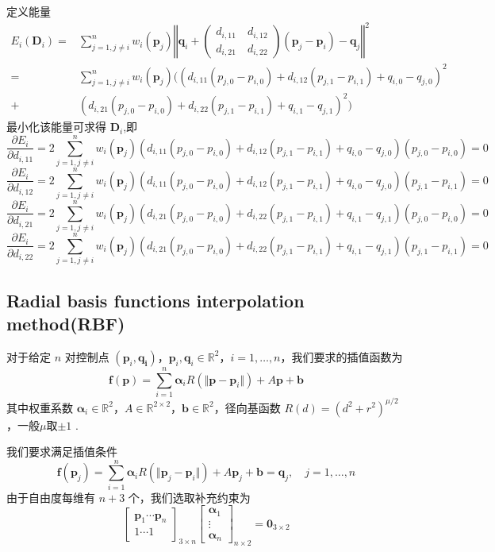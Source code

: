 \documentclass{article}
\begin{document}
	定义能量
	\begin{equation}
		\begin{aligned}
			E_i(\mathbf{D}_i)
			=&\sum_{j=1,j\neq i}^n w_{i}(\mathbf{p}_j)\left\Vert 
				\mathbf{q} _ i+\left(
				\begin{array}{c}d _ {i,11} \quad d _ 
					{i,12}\\ d _ {i,21} \quad d _ 
					{i,22}
				\end{array}
			\right)(\mathbf{p} _ 
				j-\mathbf{p} _ i)-\mathbf{q} _ j
			\right\Vert^2\\
			=&\sum _ {j=1,j\neq 
				i}^n w_{i}(\mathbf{p}_j)((d _ {i,11}(p _ {j,0}-p _ {i,0})+d _ 
				{i,12}(p _ {j,1}-p _ {i,1})+q _ {i,0}-q _ {j,0})^2\\
				+&(d _ {i,21}(p _ {j,0}-p _ {i,0})+d _ {i,22}(p _ {j,1}-p _ 
				{i,1})+q _ {i,1}-q _ {j,1})^2)
		\end{aligned}
	\end{equation}
	最小化该能量可求得 $\mathbf{D}_i$,即
	$$
	\frac{\partial E_i}{\partial d_{i,11}}
	=2\sum_{j=1,j\neq i}^n w_{i}(\mathbf{p}_j)
	(d_{i,11}(p_{j,0}-p_{i,0})+d_{i,12}(p_{j,1}-p_{i,1})+q_{i,0}-q_{j,0})
	(p_{j,0}-p_{i,0})=0
	$$
	$$
	\frac{\partial E_i}{\partial d_{i,12}}
	=2\sum_{j=1,j\neq i}^n w_{i}(\mathbf{p}_j)
	(d_{i,11}(p_{j,0}-p_{i,0})+d_{i,12}(p_{j,1}-p_{i,1})+q_{i,0}-q_{j,0})
	(p_{j,1}-p_{i,1})=0
	$$
	$$
	\frac{\partial E_i}{\partial d_{i,21}}
	=2\sum_{j=1,j\neq i}^n w_{i}(\mathbf{p}_j)
	(d_{i,21}(p_{j,0}-p_{i,0})+d_{i,22}(p_{j,1}-p_{i,1})+q_{i,1}-q_{j,1})
	(p_{j,0}-p_{i,0})=0
	$$
	$$
	\frac{\partial E_i}{\partial d_{i,22}}
	=2\sum_{j=1,j\neq i}^n w_{i}(\mathbf{p}_j)
	(d_{i,21}(p_{j,0}-p_{i,0})+d_{i,22}(p_{j,1}-p_{i,1})+q_{i,1}-q_{j,1})
	(p_{j,1}-p_{i,1})=0
	$$
	\subsection{Radial basis functions interpolation method(RBF)}
	对于给定 $n$ 对控制点 $(\mathbf{p} _ i,\mathbf{q _ i})$，$\mathbf{p} _ 
	i,\mathbf{q} _ i\in\mathbb{R}^2$，$i=1,\dots,n$，我们要求的插值函数为
	$$
	\pmb{f}(\pmb{p})=\sum _ {i=1}^n \boldsymbol{\alpha} _ i 
	R(\Vert\mathbf{p}-\mathbf{p} _ i\Vert)+A\mathbf{p}+\mathbf{b}
	$$
	其中权重系数 $\boldsymbol{\alpha} _ 
	i\in\mathbb{R}^2$，$A\in\mathbb{R}^{2\times 
	2}$，$\mathbf{b}\in\mathbb{R}^2$，径向基函数 
	$R(d)=(d^2+r^2)^{\mu/2}$，一般$\mu$取$\pm1$ .
	
	我们要求满足插值条件
	$$
	\mathbf{f}(\mathbf{p} _ j)=\sum _ {i=1}^n\boldsymbol{\alpha} _ i 
	R(\Vert\mathbf{p} _ j-\mathbf{p} _ i\Vert)+A\mathbf{p} _ 
	j+\mathbf{b}=\mathbf{q} _ j,\quad j=1,\dots,n
	$$
	由于自由度每维有 $n+3$ 个，我们选取补充约束为
	$$
	\left[\begin{array}{c}
		\mathbf{p} _ 1  \cdots  \mathbf{p} _ n\\
		1             \cdots  1
	\end{array}\right] _ {3\times n}
	\left[\begin{array}{c}
		\boldsymbol{\alpha} _ 1 \\
		\vdots \\
		\boldsymbol{\alpha} _ n
	\end{array}\right] _ {n\times2}
	=\mathbf{0} _ {3\times 2}
	$$
	\clearpage
\end{document}
